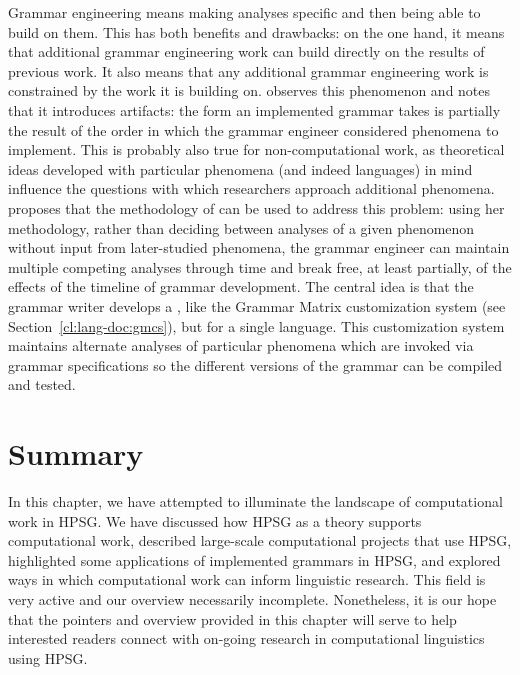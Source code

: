 \documentclass[output=paper,nonflat]{langsci/langscibook}
\begin{document}
Grammar engineering means making analyses
specific and then being able to build on them. This has both benefits
and drawbacks: on the one hand, it means that additional grammar
engineering work can build directly on the results of previous
work. It also means that any additional grammar engineering work is
constrained by the work it is building on.  \cite{Fokkens:14} observes
this phenomenon and notes that it introduces artifacts: the form an
implemented grammar takes is partially the result of the order in
which the grammar engineer considered phenomena to implement. This is
probably also true for non-computational work, as theoretical ideas
developed with particular phenomena (and indeed languages) in mind
influence the questions with which researchers approach additional
phenomena. \citeauthor{Fokkens:14} proposes that the methodology of
 can be used to address this problem: using
her  methodology, rather than deciding between analyses of a
given phenomenon without input from later-studied phenomena, the
grammar engineer can maintain multiple competing analyses through time
and break free, at least partially, of the effects of the timeline of
grammar development. The central idea is that the grammar writer develops
a , like the Grammar Matrix customization system (see Section~\ref{cl:lang-doc:gmcs}),
but for a single language. This customization system maintains
alternate analyses of particular phenomena which are invoked via grammar
specifications so the different versions of the grammar can be compiled
and tested.


\section{Summary}

In this chapter, we have attempted to illuminate the landscape of
computational work in HPSG. We have discussed how HPSG as a theory
supports computational work, described large-scale computational
projects that use HPSG, highlighted some applications of implemented
grammars in HPSG, and explored ways in which computational work can
inform linguistic research. This field is very active and our overview
necessarily incomplete. Nonetheless, it is our hope that the pointers
and overview provided in this chapter will serve to help interested readers
connect with on-going research in computational linguistics using HPSG.
\end{document}
